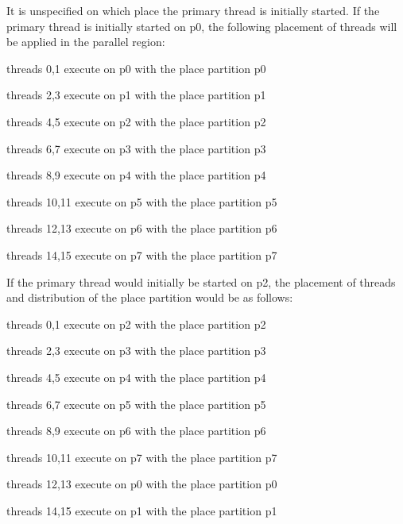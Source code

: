 It is unspecified on which place the primary thread is initially started. If the 
primary thread is initially started on p0, the following placement of threads will 
be applied in the parallel region:

\begin{compactitem}
\item threads 0,1 execute on p0 with the place partition p0

\item threads 2,3 execute on p1 with the place partition p1

\item threads 4,5 execute on p2 with the place partition p2

\item threads 6,7 execute on p3 with the place partition p3

\item threads 8,9 execute on p4 with the place partition p4

\item threads 10,11 execute on p5 with the place partition p5

\item threads 12,13 execute on p6 with the place partition p6

\item threads 14,15 execute on p7 with the place partition p7
\end{compactitem}

If the primary thread would initially be started on p2, the placement of threads 
and distribution of the place partition would be as follows:

\begin{compactitem}
\item threads 0,1 execute on p2 with the place partition p2

\item threads 2,3 execute on p3 with the place partition p3

\item threads 4,5 execute on p4 with the place partition p4

\item threads 6,7 execute on p5 with the place partition p5

\item threads 8,9 execute on p6 with the place partition p6

\item threads 10,11 execute on p7 with the place partition p7

\item threads 12,13 execute on p0 with the place partition p0

\item threads 14,15 execute on p1 with the place partition p1
\end{compactitem}

